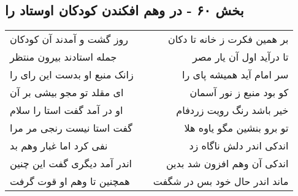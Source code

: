 \begin{center}
\section*{بخش ۶۰ - در وهم افکندن کودکان اوستاد را}
\label{sec:sh060}
\begin{longtable}{l p{0.5cm} r}
روز گشت و آمدند آن کودکان
&&
بر همین فکرت ز خانه تا دکان
\\
جمله استادند بیرون منتظر
&&
تا درآید اول آن یار مصر
\\
زانک منبع او بدست این رای را
&&
سر امام آید همیشه پای را
\\
ای مقلد تو مجو بیشی بر آن
&&
کو بود منبع ز نور آسمان
\\
او در آمد گفت استا را سلام
&&
خیر باشد رنگ رویت زردفام
\\
گفت استا نیست رنجی مر مرا
&&
تو برو بنشین مگو یاوه هلا
\\
نفی کرد اما غبار وهم بد
&&
اندکی اندر دلش ناگاه زد
\\
اندر آمد دیگری گفت این چنین
&&
اندکی آن وهم افزون شد بدین
\\
همچنین تا وهم او قوت گرفت
&&
ماند اندر حال خود بس در شگفت
\\
\end{longtable}
\end{center}
